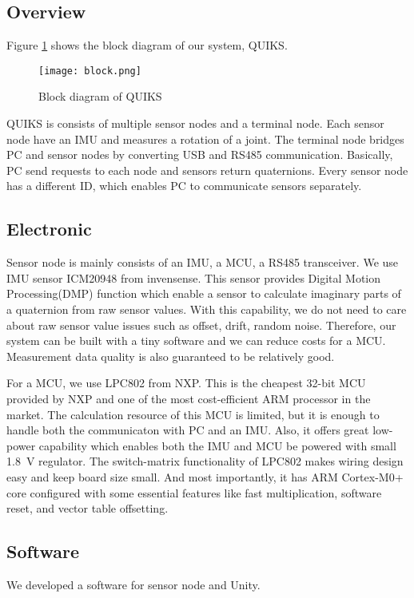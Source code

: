 \documentclass[journal]{IEEEtran}
\begin{document}
\subsection{Overview}
Figure \ref{block} shows the block diagram of our system, QUIKS.
\begin{figure}[tb]
    \centering
    \texttt{[image: block.png]}
    \caption{Block diagram of QUIKS} \label{block}
\end{figure}
QUIKS is consists of multiple sensor nodes and a terminal node.
Each sensor node have an IMU and measures a rotation of a joint.
The terminal node bridges PC and sensor nodes by converting USB and RS485 communication.
Basically, PC send requests to each node and sensors return quaternions.
Every sensor node has a different ID, which enables PC to communicate sensors separately.

\subsection{Electronic}
Sensor node is mainly consists of an IMU, a MCU, a RS485 transceiver.
We use IMU sensor ICM20948 from invensense.
This sensor provides Digital Motion Processing(DMP) function which enable a sensor to calculate imaginary parts of a quaternion from raw sensor values.
With this capability, we do not need to care about raw sensor value issues such as offset, drift, random noise.
Therefore, our system can be built with a tiny software and we can reduce costs for a MCU.
Measurement data quality is also guaranteed to be relatively good.

For a MCU, we use LPC802 from NXP.
This is the cheapest 32-bit MCU provided by NXP and one of the most cost-efficient ARM processor in the market.
The calculation resource of this MCU is limited, but it is enough to handle both the communicaton with PC and an IMU.
Also, it offers great low-power capability which enables both the IMU and MCU be powered with small \SI{1.8}{\V} regulator.
The switch-matrix functionality of LPC802 makes wiring design easy and keep board size small.
And most importantly, it has ARM Cortex-M0+ core configured with some essential features like fast multiplication, software reset, and vector table offsetting.

\subsection{Software}
We developed a software for sensor node and Unity.
\end{document}
